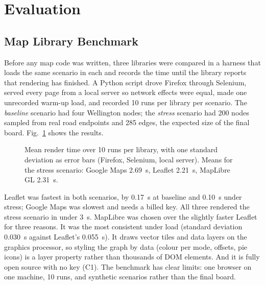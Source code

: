 \documentclass[lettersize,journal]{IEEEtran}
\begin{document}
\section{Evaluation}\label{sec:evaluation}

\subsection{Map Library Benchmark}\label{sec:benchmark}
Before any map code was written, three libraries were compared in a harness that loads the same scenario in each and records the time until the library reports that rendering has finished. A Python script drove Firefox through Selenium, served every page from a local server so network effects were equal, made one unrecorded warm-up load, and recorded 10 runs per library per scenario. The \emph{baseline} scenario had four Wellington nodes; the \emph{stress} scenario had 200 nodes sampled from real road endpoints and 285 edges, the expected size of the final board. Fig.~\ref{fig:benchmark} shows the results.

\begin{figure}[!t]
\centering
{}
\caption{Mean render time over 10 runs per library, with one standard deviation as error bars (Firefox, Selenium, local server). Means for the stress scenario: Google Maps 2.69~s, Leaflet 2.21~s, MapLibre GL 2.31~s.}
\label{fig:benchmark}
\end{figure}

Leaflet was fastest in both scenarios, by 0.17~s at baseline and 0.10~s under stress; Google Maps was slowest and needs a billed key. All three rendered the stress scenario in under 3~s. MapLibre was chosen over the slightly faster Leaflet for three reasons. It was the most consistent under load (standard deviation 0.030~s against Leaflet's 0.055~s). It draws vector tiles and data layers on the graphics processor, so styling the graph by data (colour per mode, offsets, pie icons) is a layer property rather than thousands of DOM elements. And it is fully open source with no key (C1). The benchmark has clear limits: one browser on one machine, 10 runs, and synthetic scenarios rather than the final board.
\end{document}
